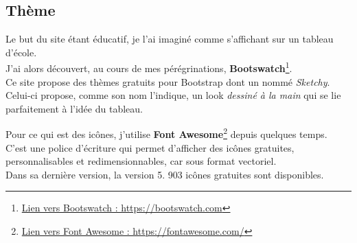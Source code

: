 \subsection{Thème}
\label{subsec:theme}
Le but du site étant éducatif, je l'ai imaginé comme s'affichant sur un tableau d'école.\\
J'ai alors découvert, au cours de mes pérégrinations, \textbf{Bootswatch}\footnote{\href{https://bootswatch.com}{Lien vers Bootswatch : https://bootswatch.com}}.\\
Ce site propose des thèmes gratuits pour Bootstrap dont un nommé \textit{Sketchy}. Celui-ci propose, comme son nom l'indique, un look \og \textit{dessiné à la main} \fg qui se lie parfaitement à l'idée du tableau.

Pour ce qui est des icônes, j'utilise \textbf{Font Awesome}\footnote{\href{https://fontawesome.com/}{Lien vers Font Awesome : https://fontawesome.com/}} depuis quelques temps.\\
C'est une police d'écriture qui permet d'afficher des icônes gratuites, personnalisables et redimensionnables, car sous format vectoriel.\\
Dans sa dernière version, la version 5. 903 icônes gratuites sont disponibles.

\vspace{1cm}

